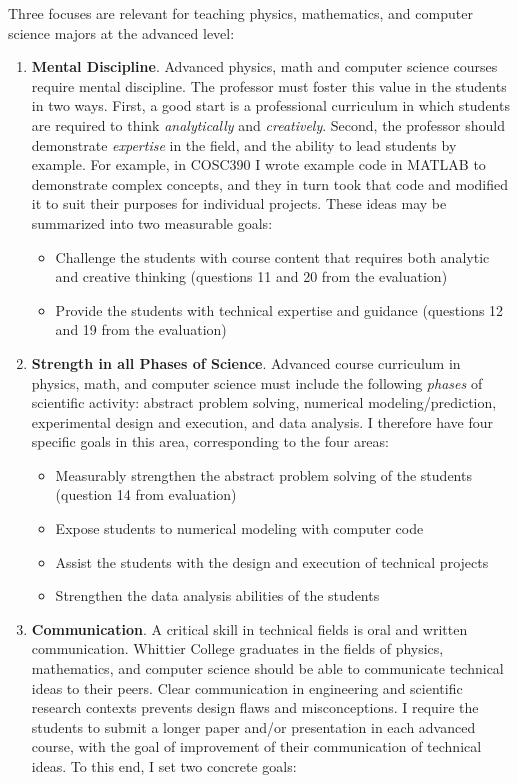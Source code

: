 \documentclass[../../main.tex]{subfiles}
\begin{document}
Three focuses are relevant for teaching physics, mathematics, and computer science majors at the advanced level:
\begin{enumerate}
\item \textbf{Mental Discipline}.  Advanced physics, math and computer science courses require mental discipline.  The professor must foster this value in the students in two ways.  First, a good start is a professional curriculum in which students are required to think \textit{analytically} and \textit{creatively}.  Second, the professor should demonstrate \textit{expertise} in the field, and the ability to lead students by example.  For example, in COSC390 I wrote example code in MATLAB to demonstrate complex concepts, and they in turn took that code and modified it to suit their purposes for individual projects. These ideas may be summarized into two measurable goals:

\begin{itemize}
\item Challenge the students with course content that requires both analytic and creative thinking (questions 11 and 20 from the evaluation)
\item Provide the students with technical expertise and guidance (questions 12 and 19 from the evaluation)
\end{itemize}

\item \textbf{Strength in all Phases of Science}. Advanced course curriculum in physics, math, and computer science must include the following \textit{phases} of scientific activity: abstract problem solving, numerical modeling/prediction, experimental design and execution, and data analysis. I therefore have four specific goals in this area, corresponding to the four areas:

\begin{itemize}
\item Measurably strengthen the abstract problem solving of the students (question 14 from evaluation)
\item Expose students to numerical modeling with computer code  %
\item Assist the students with the design and execution of technical projects %
\item Strengthen the data analysis abilities of the students %
\end{itemize}

\item \textbf{Communication}.  A critical skill in technical fields is oral and written communication.  Whittier College graduates in the fields of physics, mathematics, and computer science should be able to communicate technical ideas to their peers.  Clear communication in engineering and scientific research contexts prevents design flaws and misconceptions.  I require the students to submit a longer paper and/or presentation in each advanced course, with the goal of improvement of their communication of technical ideas.  To this end, I set two concrete goals:


\end{enumerate}
\end{document}
